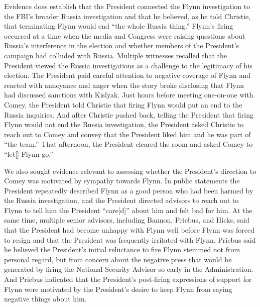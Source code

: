 Evidence does establish that the President connected the Flynn investigation to the FBI's broader Russia investigation and that he believed, as he told Christie, that terminating Flynn would end ``the whole Russia thing.''
Flynn's firing occurred at a time when the media and Congress were raising questions about Russia's interference in the election and whether members of the President's campaign had colluded with Russia.
Multiple witnesses recalled that the President viewed the Russia investigations as a challenge to the legitimacy of his election.
The President paid careful attention to negative coverage of Flynn and reacted with annoyance and anger when the story broke disclosing that Flynn had discussed sanctions with Kislyak.
Just hours before meeting one-on-one with Comey, the President told Christie that firing Flynn would put an end to the Russia inquiries.
And after Christie pushed back, telling the President that firing Flynn would not end the Russia investigation, the President asked Christie to reach out to Comey and convey that the President liked him and he was part of ``the team.''
That afternoon, the President cleared the room and asked Comey to ``let[] Flynn go.''

We also sought evidence relevant to assessing whether the President's direction to Comey was motivated by sympathy towards Flynn.
In public statements the President repeatedly described Flynn as a good person who had been harmed by the Russia investigation, and the President directed advisors to reach out to Flynn to tell him the President ``care[d]'' about him and felt bad for him.
At the same time, multiple senior advisors, including Bannon, Priebus, and Hicks, said that the President had become unhappy with Flynn well before Flynn was forced to resign and that the President was frequently irritated with Flynn.
Priebus said he believed the President's initial reluctance to fire Flynn stemmed not from personal regard, but from concern about the negative press that would be generated by firing the National Security Advisor so early in the Administration.
And Priebus indicated that the President's post-firing expressions of support for Flynn were motivated by the President's desire to keep Flynn from saying negative things about him.

